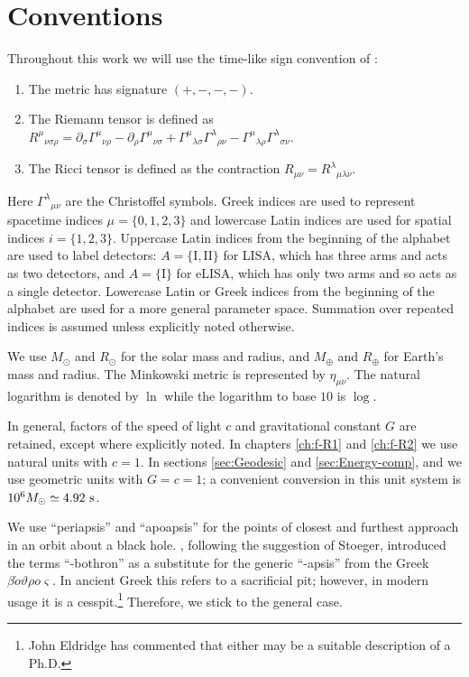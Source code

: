 \chapter{Conventions}
\label{conventions}

Throughout this work we will use the time-like sign convention of \citet{Landau1975}:
\begin{enumerate}
\item The metric has signature $(+,-,-,-)$.
\item The Riemann tensor is defined as ${R^\mu}_{\nu\sigma\rho} = \partial_\sigma {\Gamma^\mu}_{\nu\rho} - \partial_\rho {\Gamma^\mu}_{\nu\sigma} + {\Gamma^\mu}_{\lambda\sigma}{\Gamma^\lambda}_{\rho\nu} - {\Gamma^\mu}_{\lambda\rho}{\Gamma^\lambda}_{\sigma\nu}$.
\item The Ricci tensor is defined as the contraction $R_{\mu\nu} = {R^\lambda}_{\mu\lambda\nu}$.
\end{enumerate}
Here ${\Gamma^\lambda}_{\mu\nu}$ are the Christoffel symbols. Greek indices are used to represent spacetime indices $\mu = \{0,1,2,3\}$ %
and lowercase Latin indices are used for spatial indices $i = \{1,2,3\}$. Uppercase Latin indices from the beginning of the alphabet are used to label detectors: $A = \{\mathrm{I}, \mathrm{II}\}$ for LISA, which has three arms and acts as two detectors, and $A = \{\mathrm{I}\}$ for eLISA, which has only two arms and so acts as a single detector. Lowercase Latin or Greek indices from the beginning of the alphabet are used for a more general parameter space. Summation over repeated indices is assumed unless explicitly noted otherwise.

We use $M_\odot$ and $R_\odot$ for the solar mass and radius, and $M_\oplus$ and $R_\oplus$ for Earth's mass and radius. The Minkowski metric is represented by $\eta_{\mu\nu}$. The natural logarithm is denoted by $\ln$ while the logarithm to base $10$ is $\log$.

In general, factors of the speed of light $c$ and gravitational constant $G$ are retained, except where explicitly noted. In chapters \ref{ch:f-R1} and \ref{ch:f-R2} we use natural units with $c = 1$. In sections \ref{sec:Geodesic} and \ref{sec:Energy-comp},  and  we use geometric units with $G = c = 1$; a convenient conversion in this unit system is $10^6 M_\odot \simeq 4.92~\mathrm{s}$.

We use ``periapsis'' and ``apoapsis'' for the points of closest and furthest approach in an orbit about a black hole. \citet{Frank1976}, following the suggestion of Stoeger, introduced the terms ``-bothron'' as a substitute for the generic ``-apsis'' from the Greek {$\mathit{\beta\acute{o}\vartheta\rho o \varsigma}$}. In ancient Greek this refers to a sacrificial pit; however, in modern usage it is a cesspit.\footnote{John Eldridge has commented that either may be a suitable description of a Ph.D.} Therefore, we stick to the general case.
